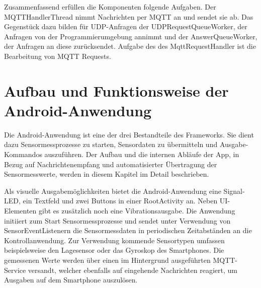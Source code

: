 \documentclass[11pt,a4paper]{report}
\begin{document}
Zusammenfassend erfüllen die Komponenten folgende Aufgaben.
Der MQTTHandlerThread nimmt Nachrichten per MQTT an und sendet sie ab.
Das Gegenstück dazu bilden für UDP-Anfragen der UDPRequestQueueWorker, der Anfragen von der Programmierumgebung annimmt und der AnswerQueueWorker, der Anfragen an diese zurücksendet.
Aufgabe des des MqttRequestHandler ist die Bearbeitung von MQTT Requests.

\chapter{Aufbau und Funktionsweise der Android-Anwendung}\label{chap:app}
Die Android-Anwendung ist eine der drei Bestandteile des Frameworks.
Sie dient dazu Sensormessprozesse zu starten, Sensordaten zu übermitteln und Ausgabe-Kommandos auszuführen.
Der Aufbau und die internen Abläufe der App, in Bezug auf Nachrichtenempfang und automatisierter Übertragung der Sensormesswerte, werden in diesem Kapitel im Detail beschrieben.

Als visuelle Ausgabemöglichkeiten bietet die Android-Anwendung eine Signal-LED, ein Textfeld und zwei Buttons in einer RootActivity an.
Neben UI-Elementen gibt es zusätzlich noch eine Vibrationsausgabe. 
Die Anwendung initiiert zum Start Sensormessprozesse und sendet unter Verwendung von SensorEventListenern die Sensormessdaten in periodischen Zeitabständen an die Kontrollanwendung.
Zur Verwendung kommende Sensortypen umfassen beispielsweise den Lagesensor oder das Gyroskop des Smartphones.
Die gemessenen Werte werden über einen im Hintergrund ausgeführten MQTT-Service versandt, welcher ebenfalls auf eingehende Nachrichten reagiert, um Ausgaben auf dem Smartphone auszulösen.
\end{document}
